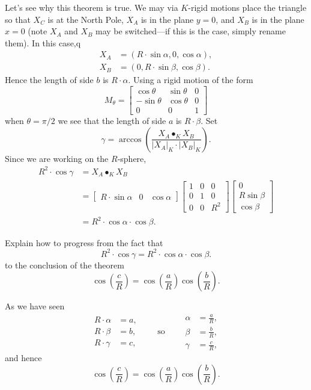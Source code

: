 \documentclass{ximera}
\begin{document}
Let's see why this theorem is true.  We may via $K$-rigid motions
place the triangle so that $X_C$ is at the North Pole, $X_A$ is in the
plane $y=0$, and $X_B$ is in the plane $x=0$ (note $X_A$ and $X_B$ may
be switched---if this is the case, simply rename them). In this case,q
\begin{align*}
  X_A &= (R\cdot \sin\alpha, 0, \cos\alpha),\\
  X_B &= (0, R\cdot \sin \beta, \cos\beta).
\end{align*}
Hence the length of side $b$ is $R\cdot\alpha$. Using a rigid motion of the form
\[
M_\theta=
\begin{bmatrix}
  \cos\theta & \sin\theta & 0\\
  -\sin\theta & \cos\theta & 0\\
  0 & 0 & 1
\end{bmatrix}
\]
when $\theta = \pi/2$ we see that the length of side $a$ is $R\cdot
\beta$. Set
\[
\gamma = \arccos\left(\frac{X_A\bullet_K X_B}{|X_A|_K\cdot |X_B|_K}\right).
\]
Since we are working on the $R$-sphere,
\begin{align*}
  R^2\cdot \cos \gamma &= X_A\bullet_K X_B\\
  &=
  \begin{bmatrix}
    R\cdot \sin\alpha &  0 & \cos\alpha
  \end{bmatrix}
    \begin{bmatrix}
      1 & 0 & 0\\
      0 & 1 & 0\\
      0 & 0 & R^2
    \end{bmatrix}
    \begin{bmatrix}
      0\\
      R\sin\beta\\
      \cos\beta
    \end{bmatrix}\\
   &=R^2 \cdot \cos\alpha \cdot \cos\beta.
  \end{align*}
\begin{problem}
  Explain how to progress from the fact that
  \[
  R^2\cdot \cos \gamma = R^2 \cdot \cos\alpha \cdot \cos\beta.
  \]
  to the conclusion of the theorem
  \[
  \cos\left(\frac{c}{R}\right)=\cos\left(\frac{a}{R}\right)\cos\left(\frac{b}{R}\right).
  \]
  \begin{freeResponse}
    As we have seen
    \[
    \begin{split}
      R\cdot \alpha &= a,\\
      R\cdot \beta  &= b,\\
      R\cdot \gamma &= c,
    \end{split}
    \qquad\text{so}\qquad
    \begin{split}
      \alpha &= \frac{a}{R},\\
      \beta  &= \frac{b}{R},\\
      \gamma &= \frac{c}{R},
    \end{split}
    \]
    and hence
    \[
    \cos\left(\frac{c}{R}\right)=\cos\left(\frac{a}{R}\right)\cos\left(\frac{b}{R}\right).
    \]
  \end{freeResponse}
\end{problem}
\end{document}
